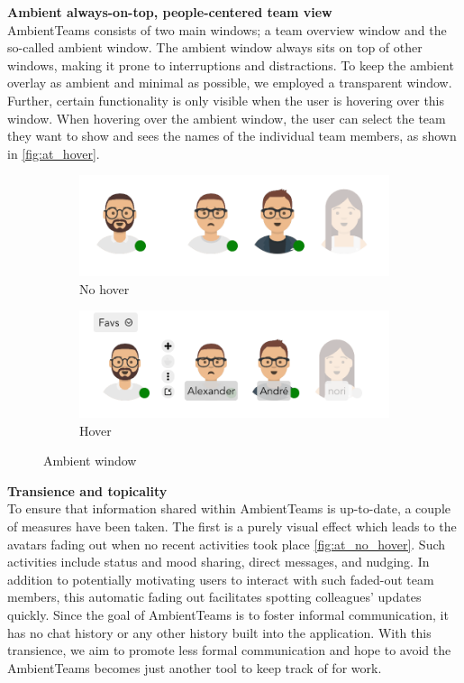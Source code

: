 \medskip\noindent\textbf{Ambient always-on-top, people-centered team view} \\
AmbientTeams consists of two main windows; a team overview window and the so-called ambient window. The ambient window always sits on top of other windows, making it prone to interruptions and distractions. To keep the ambient overlay as ambient and minimal as possible, we employed a transparent window. Further, certain functionality is only visible when the user is hovering over this window. When hovering over the ambient window, the user can select the team they want to show and sees the names of the individual team members, as shown in \autoref{fig:at_hover}.

\begin{figure}[h]
    \centering
    \begin{subfigure}{.5\textwidth}
        \centering
        \includegraphics[width=.8\linewidth]{./images/AT_no_hover.png}
        \caption{No hover }
        \label{fig:at_no_hover}
    \end{subfigure}%
    \begin{subfigure}{.5\textwidth}
        \centering
        \includegraphics[width=.8\linewidth]{./images/AT_hover.png}
        \caption{Hover }
        \label{fig:at_hover}
    \end{subfigure}
    \caption{Ambient window}
\end{figure}

\medskip\noindent\textbf{Transience and topicality} \\
To ensure that information shared within AmbientTeams is up-to-date, a couple of measures have been taken. The first is a purely visual effect which leads to the avatars fading out when no recent activities took place \autoref{fig:at_no_hover}. Such activities include status and mood sharing, direct messages, and nudging. In addition to potentially motivating users to interact with such faded-out team members, this automatic fading out facilitates spotting colleagues' updates quickly.
Since the goal of AmbientTeams is to foster informal communication, it has no chat history or any other history built into the application. With this transience, we aim to promote less formal communication and hope to avoid the AmbientTeams becomes just another tool to keep track of for work.

